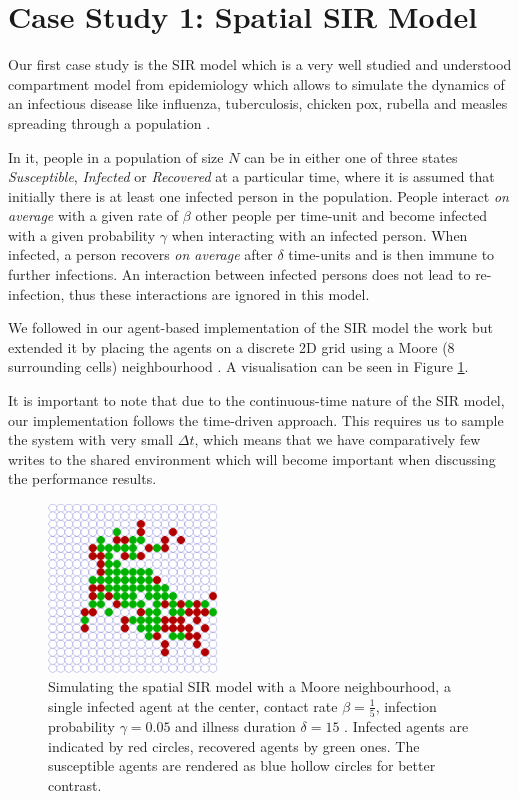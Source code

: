 \section{Case Study 1: Spatial SIR Model} %
\label{sec:cs_sir}

Our first case study is the SIR model which is a very well studied and understood compartment model from epidemiology \cite{kermack_contribution_1927} which allows to simulate the dynamics of an infectious disease like influenza, tuberculosis, chicken pox, rubella and measles spreading through a population \cite{enns_its_2010}.

In it, people in a population of size $N$ can be in either one of three states \textit{Susceptible}, \textit{Infected} or \textit{Recovered} at a particular time, where it is assumed that initially there is at least one infected person in the population. People interact \textit{on average} with a given rate of $\beta$ other people per time-unit and become infected with a given probability $\gamma$ when interacting with an infected person. When infected, a person recovers \textit{on average} after $\delta$ time-units and is then immune to further infections. An interaction between infected persons does not lead to re-infection, thus these interactions are ignored in this model. 

We followed in our agent-based implementation of the SIR model the work \cite{macal_agent-based_2010} but extended it by placing the agents on a discrete 2D grid using a Moore (8 surrounding cells) neighbourhood \cite{thaler_pure_2019}. A visualisation can be seen in Figure \ref{fig:vis_sir}.

It is important to note that due to the continuous-time nature of the SIR model, our implementation follows the time-driven \cite{meyer_event-driven_2014} approach. This requires us to sample the system with very small $\Delta t$, which means that we have comparatively few writes to the shared environment which will become important when discussing the performance results.

\begin{figure}
	\centering
	\includegraphics[width=0.4\textwidth, angle=0]{./fig/sir/vis/SIR_Dunai_dt001_environment.png}
	\caption{Simulating the spatial SIR model with a Moore neighbourhood, a single infected agent at the center, contact rate $\beta = \frac{1}{5}$, infection probability $\gamma = 0.05$ and illness duration $\delta = 15$ . Infected agents are indicated by red circles, recovered agents by green ones. The susceptible agents are rendered as blue hollow circles for better contrast.}
	\label{fig:vis_sir}
\end{figure}

